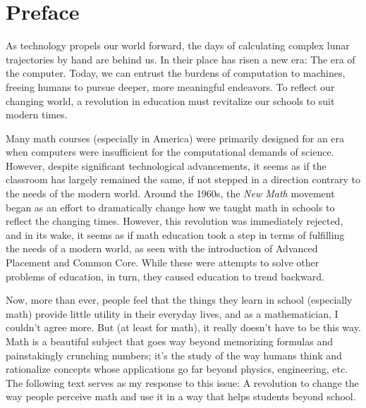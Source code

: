 \edef\mychapter{Preface}
\edef\mychapterdate{March 11, 2025}

\chapter*{\mychapter}
As technology propels our world forward, the days of calculating complex lunar trajectories by hand are behind us.
In their place has risen a new era: The era of the computer.
Today, we can entrust the burdens of computation to machines, freeing humans to pursue deeper, more meaningful endeavors.
To reflect our changing world, a revolution in education must revitalize our schools to suit modern times.

Many math courses (especially in America) were primarily designed for an era when computers were insufficient for the computational demands of science.
However, despite significant technological advancements, it seems as if the classroom has largely remained the same, if not stepped in a direction contrary to the needs of the modern world.
Around the 1960s, the \textit{New Math} movement began as an effort to dramatically change how we taught math in schools to reflect the changing times.
However, this revolution was immediately rejected, and in its wake, it seems as if math education took a step in terms of fulfilling the needs of a modern world, as seen with the introduction of Advanced Placement and Common Core.
While these were attempts to solve other problems of education, in turn, they caused education to trend backward.

Now, more than ever, people feel that the things they learn in school (especially math) provide little utility in their everyday lives, and as a mathematician, I couldn't agree more.
But (at least for math), it really doesn't have to be this way.
Math is a beautiful subject that goes way beyond memorizing formulas and painstakingly crunching numbers; it's the study of the way humans think and rationalize concepts whose applications go far beyond physics, engineering, etc.
The following text serves as my response to this issue:
A revolution to change the way people perceive math and use it in a way that helps students beyond school.

